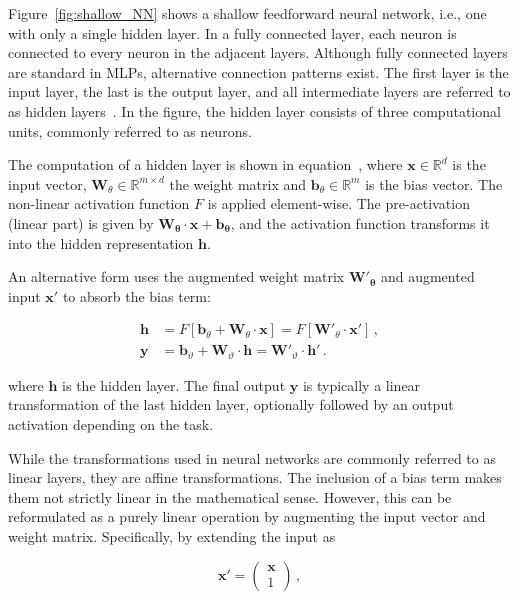 Figure~\ref{fig:shallow_NN} shows a shallow feedforward neural network, i.e., one with only a single hidden layer. In a fully connected layer, each neuron is connected to every neuron in the adjacent layers. Although fully connected layers are standard in MLPs, alternative connection patterns exist. 
The first layer is the input layer, the last is the output layer, and all intermediate layers are referred to as hidden layers~\cite{prince_understanding_2023}. In the figure, the hidden layer consists of three computational units, commonly referred to as neurons. 

The computation of a hidden layer is shown in equation~, where $\mathbf{x} \in \mathbb{R}^d$ is the input vector, $\mathbf{W}_{\theta} \in \mathbb{R}^{m \times d}$ the weight matrix and $\mathbf{b}_{\theta} \in \mathbb{R}^m$ is the bias vector. The non-linear activation function $F$ is applied element-wise. 
The pre-activation (linear part) is given by $\mathbf{W}_{\boldsymbol{\theta}} \cdot \mathbf{x} + \mathbf{b}_{\boldsymbol{\theta}}$, and the activation function transforms it into the hidden representation $\mathbf{h}$. 

An alternative form uses the augmented weight matrix $\mathbf{W'}_{\boldsymbol{\theta}}$ and augmented input $\mathbf{x'}$ to absorb the bias term: 

\begin{align}
\label{eq:NN_hiddenlayer}
	\mathbf{h} & = F \left[ \mathbf{b}_{\theta} + \mathbf{W}_{\theta} \cdot \mathbf{x} \right] = F \left[ \mathbf{W'}_{\theta} \cdot \mathbf{x'} \right] \,,\\
\label{eq:NN_hiddenlayer_out}
	\mathbf{y} & = \mathbf{b}_{\vartheta} + \mathbf{W}_{\vartheta} \cdot \mathbf{h} = \mathbf{W'}_{\vartheta} \cdot \mathbf{h'} \,.
\end{align}

\noindent where $\mathbf{h}$ is the hidden layer. The final output $\mathbf{y}$ is typically a linear transformation of the last hidden layer, optionally followed by an output activation depending on the task. 

While the transformations used in neural networks are commonly referred to as linear layers, they are affine transformations. The inclusion of a bias term makes them not strictly linear in the mathematical sense. However, this can be reformulated as a purely linear operation by augmenting the input vector and weight matrix. Specifically, by extending the input as 

\begin{equation}
\label{eq:affine_to_linear_x}
    \mathbf{x'} = \begin{pmatrix} \mathbf{x} \\ 1 \end{pmatrix} \,,
\end{equation}

